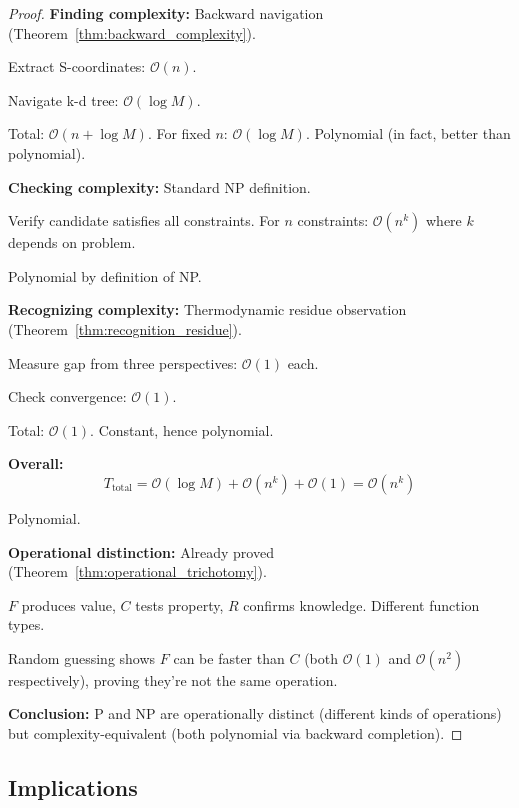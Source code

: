 \documentclass[twocolumn,10pt]{article}
\theoremstyle{definition}
\theoremstyle{remark}
\newcommand{\bigO}{\mathcal{O}}
\begin{document}
\begin{proof}
\textbf{Finding complexity:} Backward navigation (Theorem~\ref{thm:backward_complexity}).

Extract S-coordinates: $\bigO(n)$.

Navigate k-d tree: $\bigO(\log M)$.

Total: $\bigO(n + \log M)$. For fixed $n$: $\bigO(\log M)$. Polynomial (in fact, better than polynomial).

\vspace{0.2cm}
\noindent\textbf{Checking complexity:} Standard NP definition.

Verify candidate satisfies all constraints. For $n$ constraints: $\bigO(n^k)$ where $k$ depends on problem.

Polynomial by definition of NP.

\vspace{0.2cm}
\noindent\textbf{Recognizing complexity:} Thermodynamic residue observation (Theorem~\ref{thm:recognition_residue}).

Measure gap from three perspectives: $\bigO(1)$ each.

Check convergence: $\bigO(1)$.

Total: $\bigO(1)$. Constant, hence polynomial.

\vspace{0.2cm}
\noindent\textbf{Overall:}
\begin{equation}
T_{\text{total}} = \bigO(\log M) + \bigO(n^k) + \bigO(1) = \bigO(n^k)
\end{equation}

Polynomial.

\vspace{0.2cm}
\noindent\textbf{Operational distinction:} Already proved (Theorem~\ref{thm:operational_trichotomy}).

$F$ produces value, $C$ tests property, $R$ confirms knowledge. Different function types.

Random guessing shows $F$ can be faster than $C$ (both $\bigO(1)$ and $\bigO(n^2)$ respectively), proving they're not the same operation.

\vspace{0.2cm}
\noindent\textbf{Conclusion:} P and NP are operationally distinct (different kinds of operations) but complexity-equivalent (both polynomial via backward completion).
\end{proof}

\subsection{Implications}
\end{document}
